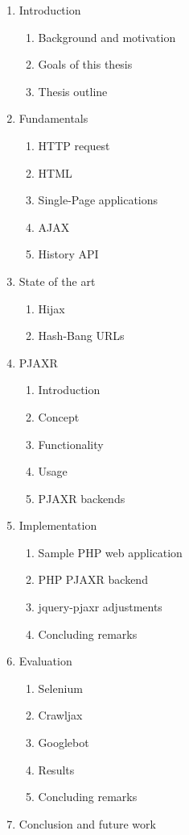 \documentclass[f,bachelor,binding,twoside,palatino]{WeSTthesis}
\def \ajax {AJAX}
\def \pjaxr {PJAXR}
\def \jqueryPjaxr {jquery-pjaxr}
\def \httpRequest {HTTP request}
\begin{document}
\begin{enumerate}
  \item Introduction
  \begin{enumerate}[label*=\arabic*.]
    \item Background and motivation
    \item Goals of this thesis
    \item Thesis outline
  \end{enumerate}
  \item Fundamentals
  \begin{enumerate}[label*=\arabic*.]
    \item \httpRequest{}
    \item HTML
    \item Single-Page applications
    \item \ajax{}
    \item History API
  \end{enumerate}
  \item State of the art
  \begin{enumerate}[label*=\arabic*.]
    \item Hijax
    \item Hash-Bang URLs
  \end{enumerate}
  \item \pjaxr{}
  \begin{enumerate}[label*=\arabic*.]
    \item Introduction
    \item Concept
    \item Functionality
    \item Usage
    \item \pjaxr{} backends
  \end{enumerate}
  \item Implementation
  \begin{enumerate}[label*=\arabic*.]
    \item Sample PHP web application
    \item PHP \pjaxr{} backend
    \item \jqueryPjaxr{} adjustments
    \item Concluding remarks
  \end{enumerate}
  \item Evaluation
  \begin{enumerate}[label*=\arabic*.]
    \item Selenium
    \item Crawljax
    \item Googlebot
    \item Results
    \item Concluding remarks
  \end{enumerate}
  \item Conclusion and future work

\end{enumerate}
\end{document}

